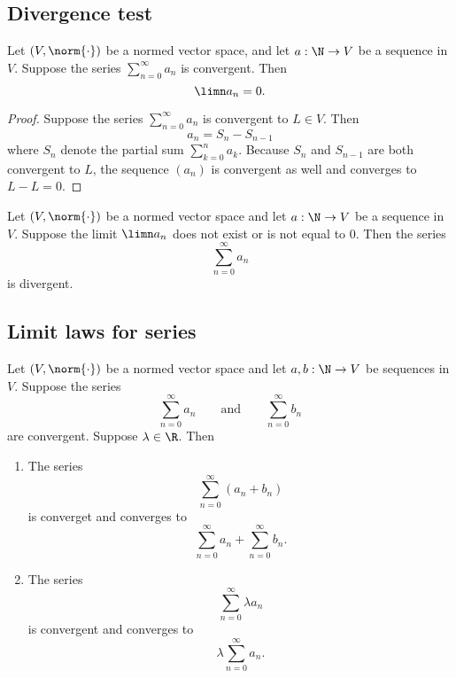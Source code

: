 \subsection{Divergence test}
\begin{proposition}
    Let $(V,\norm{\cdot})$ be a normed vector space, and let $a:\N \to V$ be a sequence in $V$. Suppose the series $\displaystyle\sum_{n=0}^{\infty}a_n$ is convergent. Then
    $$\limn a_n = 0.$$
\end{proposition}
\begin{proof}[Proof]
    Suppose the series $\displaystyle\sum_{n=0}^{\infty}a_n$ is convergent to $L \in V$. Then
    $$a_n = S_n - S_{n-1}$$
    where $S_n$ denote the partial sum $\displaystyle\sum_{k=0 }^{n }a_k$. Because $S_n$ and $S_{n-1}$ are both convergent to $L$, the sequence $(a_n)$ is convergent as well and converges to $L - L = 0$.
\end{proof}

\begin{theorem}
    Let $(V, \norm{\cdot})$ be a normed vector space and let $a: \N \to V$ be a sequence in $V$. Suppose the limit $\limn a_n$ does not exist or is not equal to $0$. Then the series
    $$\sum_{n=0}^\infty a_n$$
    is divergent.
\end{theorem}

\subsection{Limit laws for series}
\begin{theorem}
    Let $(V, \norm{\cdot})$ be a normed vector space and let $a,b: \N \to V$ be sequences in $V$. Suppose the series
    $$\sum_{n=0}^\infty a_n \qquad \text{and} \qquad \sum_{n=0}^\infty b_n$$
    are convergent. Suppose $\lambda \in \R$. Then
    \begin{enumerate}
        \item The series
            $$\sum_{n=0}^{\infty}(a_n + b_n)$$
            is converget and converges to
            $$\sum_{n=0}^\infty a_n + \sum_{n=0}^\infty b_n.$$
        \item The series 
            $$\sum_{n=0}^\infty \lambda a_n$$
            is convergent and converges to
            $$\lambda \sum_{n=0}^\infty a_n.$$
    \end{enumerate}
\end{theorem}
